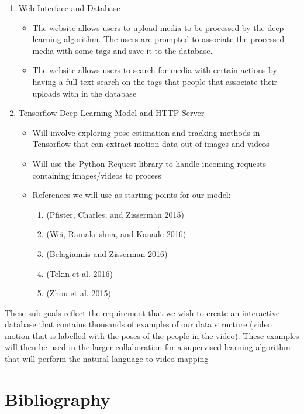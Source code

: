 \documentclass[a4paper, 12pt]{article}
\begin{document}
\begin{enumerate} \item Web-Interface and Database \begin{itemize} \item The
website allows users to upload media to be processed by the deep learning
algorithm. The users are prompted to associate the processed media with some
tags and save it to the database. \item The website allows users to search for
media with certain actions by having a full-text search on the tags that people
that associate their uploads with in the database \end{itemize}

    \item Tensorflow Deep Learning Model and HTTP Server \begin{itemize} \item
    Will involve exploring pose estimation and tracking methods in Tensorflow
    that can extract motion data out of images and videos \item Will use the
    Python Request library to handle incoming requests containing images/videos
    to process \item References we will use as starting points for our model:
    \begin{enumerate}[i] \item (Pfister, Charles, and Zisserman 2015) \item
    (Wei, Ramakrishna, and Kanade 2016) \item (Belagiannis and Zisserman 2016)
    \item (Tekin et al. 2016) \item (Zhou et al. 2015) \end{enumerate}
    \end{itemize} \end{enumerate}

These sub-goals reflect the requirement that we wish to create an interactive
database that contains thousands of examples of our data structure (video motion
that is labelled with the poses of the people in the video). These examples will
then be used in the larger collaboration for a supervised learning algorithm
that will perform the natural language to video mapping

\section{Bibliography}
\end{document}
